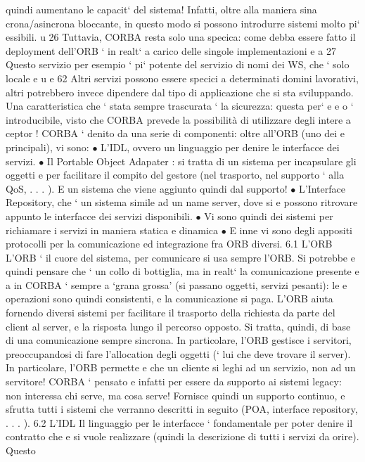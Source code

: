 \documentclass[a4paper,12pt]{article}
\begin{document}
quindi aumentano le capacit` del sistema! Infatti, oltre alla maniera sina
crona/asincrona bloccante, in questo modo si possono introdurre sistemi
molto pi` essibili.
u
26 Tuttavia, CORBA resta solo una specica: come debba essere fatto il deployment
dell'ORB ` in realt` a carico delle singole implementazioni
e
a
27 Questo servizio per esempio ` pi` potente del servizio di nomi dei WS, che ` solo locale
e u
e
62
Altri servizi possono essere specici a determinati domini lavorativi, altri potrebbero invece dipendere dal tipo di
applicazione che si sta sviluppando.
Una caratteristica che ` stata sempre trascurata ` la sicurezza: questa per`
e
e
o
` introducibile, visto che CORBA prevede la possibilità di utilizzare degli intere
a
ceptor !
CORBA ` denito da una serie di componenti: oltre all'ORB (uno dei
e
principali), vi sono:
$\bullet$ L'IDL, ovvero un linguaggio per denire le interfacce dei servizi.
$\bullet$ Il Portable Object Adapater : si tratta di un sistema per incapsulare gli
oggetti e per facilitare il compito del gestore (nel trasporto, nel supporto
`
alla QoS, . . . ). E un sistema che viene aggiunto quindi dal supporto!
$\bullet$ L'Interface Repository, che ` un sistema simile ad un name server, dove si
e
possono ritrovare appunto le interfacce dei servizi disponibili.
$\bullet$ Vi sono quindi dei sistemi per richiamare i servizi in maniera statica e
dinamica
$\bullet$ E inne vi sono degli appositi protocolli per la comunicazione ed integrazione fra ORB diversi.
6.1
L'ORB
L'ORB ` il cuore del sistema, per comunicare si usa sempre l'ORB. Si potrebbe
e
quindi pensare che ` un collo di bottiglia, ma in realt` la comunicazione presente
e
a
in CORBA ` sempre a {`}grana grossa' (si passano oggetti, servizi pesanti): le
e
operazioni sono quindi consistenti, e la comunicazione si paga. L'ORB aiuta
fornendo diversi sistemi per facilitare il trasporto della richiesta da parte del
client al server, e la risposta lungo il percorso opposto. Si tratta, quindi, di base
di una comunicazione sempre sincrona.
In particolare, l'ORB gestisce i servitori, preoccupandosi di fare l'allocation
degli oggetti (` lui che deve trovare il server). In particolare, l'ORB permette
e
che un cliente si leghi ad un servizio, non ad un servitore! CORBA ` pensato
e
infatti per essere da supporto ai sistemi legacy: non interessa chi serve, ma
cosa serve! Fornisce quindi un supporto continuo, e sfrutta tutti i sistemi che
verranno descritti in seguito (POA, interface repository, . . . ).
6.2
L'IDL
Il linguaggio per le interfacce ` fondamentale per poter denire il contratto che
e
si vuole realizzare (quindi la descrizione di tutti i servizi da orire). Questo
\end{document}
